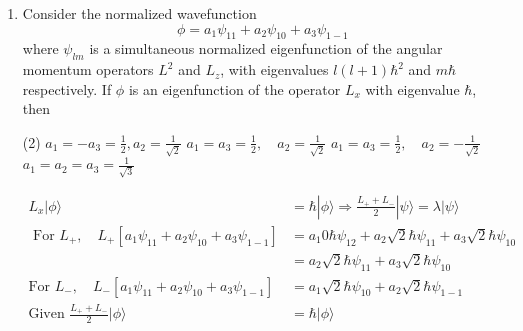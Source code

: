 \begin{enumerate}
	If $L$ is the total angular momentum of the particle, the value of $L^{2}$ must be
{	}
\begin{tasks}(4)
\task[\textbf{A.}] $2 \hbar^{2}$
\task[\textbf{B.}] $\hbar^{2}$
\task[\textbf{C.}] $4 \hbar^{2}$
\task[\textbf{D.}] $\frac{3}{4} \hbar^{2}$
\end{tasks}
\begin{answer}
\begin{align*}
\psi(r)&=z f(r)=r \cos \theta f(r)\\
\cos \theta&=P_{1}(\cos \theta) \Rightarrow l=1\\
\psi(r, \theta, \varphi)&=P_{1}(\cos \theta) r f(r)
\intertext{the measure at $L^{2}$ have eigen value}
l(l+1) \hbar^{2} \quad\text{ put }l&=1 \quad 1(l+1) \hbar^{2}=2 \hbar^{2}
\end{align*}
So the correct answer is \textbf{Option (A)}
\end{answer}
	\item Consider the normalized wavefunction
	$$
	\phi=a_{1} \psi_{11}+a_{2} \psi_{10}+a_{3} \psi_{1-1}
	$$
	where $\psi_{l m}$ is a simultaneous normalized eigenfunction of the angular momentum operators $L^{2}$ and $L_{z}$, with eigenvalues $l(l+1) \hbar^{2}$ and $m \hbar$ respectively. If $\phi$ is an eigenfunction of the operator $L_{x}$ with eigenvalue $\hbar$, then
{	}
\begin{tasks}(2)
\task[\textbf{A.}] $a_{1}=-a_{3}=\frac{1}{2}, a_{2}=\frac{1}{\sqrt{2}}$
\task[\textbf{B.}] $a_{1}=a_{3}=\frac{1}{2}, \quad a_{2}=\frac{1}{\sqrt{2}}$
\task[\textbf{C.}] $a_{1}=a_{3}=\frac{1}{2}, \quad a_{2}=-\frac{1}{\sqrt{2}}$
\task[\textbf{D.}] $a_{1}=a_{2}=a_{3}=\frac{1}{\sqrt{3}}$
\end{tasks}
\begin{answer}
\begin{align*}
L_{x}|\phi\rangle&=\hbar|\phi\rangle \Rightarrow \frac{L_{+}+L_{-}}{2}|\psi\rangle=\lambda|\psi\rangle\\
\text{	For }L_{+}, \quad L_{+}\left[a_{1} \psi_{11}+a_{2} \psi_{10}+a_{3} \psi_{1-1}\right]&=a_{1} 0 \hbar \psi_{12}+a_{2} \sqrt{2} \hbar \psi_{11}+a_{3} \sqrt{2} \hbar \psi_{10}\\
&=a_{2} \sqrt{2} \hbar \psi_{11}+a_{3} \sqrt{2} \hbar \psi_{10}\\
\text{For }L_{-}, \quad L_{-}\left[a_{1} \psi_{11}+a_{2} \psi_{10}+a_{3} \psi_{1-1}\right]&=a_{1} \sqrt{2} \hbar \psi_{10}+a_{2} \sqrt{2} \hbar \psi_{1-1}\\
\text{Given }\frac{L_{+}+L_{-}}{2}|\phi\rangle&=\hbar|\phi\rangle\\

\end{align*}
\end{answer}
\end{enumerate}

